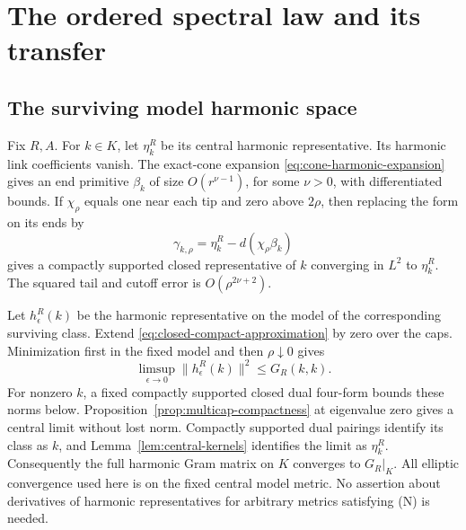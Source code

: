 \section{The ordered spectral law and its transfer}\label{sec:multiple}

\subsection{The surviving model harmonic space}
Fix $R,A$. For $k\in K$, let $\eta_k^R$ be its central harmonic
representative. Its harmonic link coefficients vanish. The exact-cone
expansion \eqref{eq:cone-harmonic-expansion} gives an end primitive
$\beta_k$ of size $O(r^{\nu-1})$, for some $\nu>0$, with differentiated
bounds. If $\chi_\rho$ equals one near each tip and zero above $2\rho$,
then replacing the form on its ends by
\begin{equation}\label{eq:closed-compact-approximation}
 \gamma_{k,\rho}=\eta_k^R-d(\chi_\rho\beta_k)
\end{equation}
gives a compactly supported closed representative of $k$ converging in
$L^2$ to $\eta_k^R$. The squared tail and cutoff error is
$O(\rho^{2\nu+2})$.

Let $h_\epsilon^R(k)$ be the harmonic representative on the model of the
corresponding surviving class. Extend \eqref{eq:closed-compact-approximation}
by zero over the caps. Minimization first in the fixed model and then
$\rho\downarrow0$ gives
\[
 \limsup_{\epsilon\to0}\|h_\epsilon^R(k)\|^2\le G_R(k,k).
\]
For nonzero $k$, a fixed compactly supported closed dual four-form bounds
these norms below. Proposition~\ref{prop:multicap-compactness} at eigenvalue
zero gives a central limit without lost norm. Compactly supported dual
pairings identify its class as $k$, and Lemma~\ref{lem:central-kernels}
identifies the limit as $\eta_k^R$. Consequently the full harmonic Gram
matrix on $K$ converges to $G_R|_K$. All elliptic convergence used here
is on the fixed central model metric. No assertion about derivatives of
harmonic representatives for arbitrary metrics satisfying \textup{(N)}
is needed.

